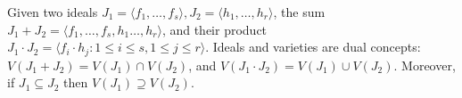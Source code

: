 Given two ideals $J_1 = \langle f_1,\dots,f_s\rangle, J_2=\langle
h_1,\dots,h_r\rangle$, the sum $J_1 + J_2 = \langle
f_1,\dots,f_s,h_1\dots,h_r\rangle$, and their product $J_1\cdot J_2 =
\langle f_i\cdot h_j: 1\leq i\leq s, 1\leq j\leq r\rangle$. Ideals and
varieties are dual concepts: $V(J_1 + J_2) = V(J_1) \cap V(J_2)$, and
$V(J_1\cdot J_2) = V(J_1) \cup V(J_2)$. Moreover, if $J_1 \subseteq
J_2$ then $V(J_1)\supseteq V(J_2)$.


\vspace{0.075in}
